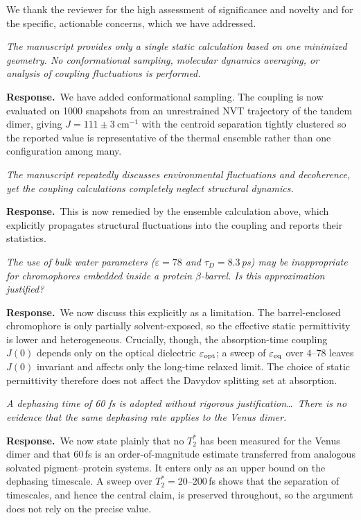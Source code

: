 \documentclass[11pt]{article}
\newcommand{\comment}[1]{\begin{revcomment}\itshape #1\end{revcomment}}
\newcommand{\response}[1]{\noindent\textbf{Response.}\ #1\par\vspace{6pt}}
\begin{document}
We thank the reviewer for the high assessment of significance and novelty and for the
specific, actionable concerns, which we have addressed.

\comment{The manuscript provides only a single static calculation based on one
minimized geometry. No conformational sampling, molecular dynamics averaging, or
analysis of coupling fluctuations is performed.}

\response{We have added conformational sampling. The coupling is now evaluated on 1000
snapshots from an unrestrained NVT trajectory of the tandem dimer, giving
$J = 111 \pm 3~\mathrm{cm^{-1}}$ with the centroid separation tightly clustered so the reported value is
representative of the thermal ensemble rather than one configuration among many.}

\comment{The manuscript repeatedly discusses environmental fluctuations and
decoherence, yet the coupling calculations completely neglect structural dynamics.}

\response{This is now remedied by the ensemble calculation above, which explicitly
propagates structural fluctuations into the coupling and reports their statistics.}

\comment{The use of bulk water parameters ($\varepsilon = 78$ and $\tau_D = 8.3$\,ps)
may be inappropriate for chromophores embedded inside a protein $\beta$-barrel. Is this
approximation justified?}

\response{We now discuss this explicitly as a limitation. The barrel-enclosed
chromophore is only partially solvent-exposed, so the effective static permittivity is
lower and heterogeneous. Crucially, though, the absorption-time coupling $J(0)$ depends
only on the optical dielectric $\varepsilon_{\rm opt}$; a sweep of $\varepsilon_{\rm eq}$
over $4$--$78$ leaves $J(0)$ invariant and affects only the long-time relaxed limit.
The choice of static permittivity therefore does not affect the Davydov splitting set
at absorption.}

\comment{A dephasing time of 60 fs is adopted without rigorous justification\ldots\
There is no evidence that the same dephasing rate applies to the Venus dimer.}

\response{We now state plainly that no $T_2^{*}$ has been measured for the Venus dimer
and that $60$\,fs is an order-of-magnitude estimate transferred from analogous solvated
pigment--protein systems. It enters only as an upper bound on the dephasing timescale.
A sweep over $T_2^{*} = 20$--$200$\,fs shows that the separation of timescales, and
hence the central claim, is preserved throughout, so the argument does not rely on the
precise value.}
\end{document}
